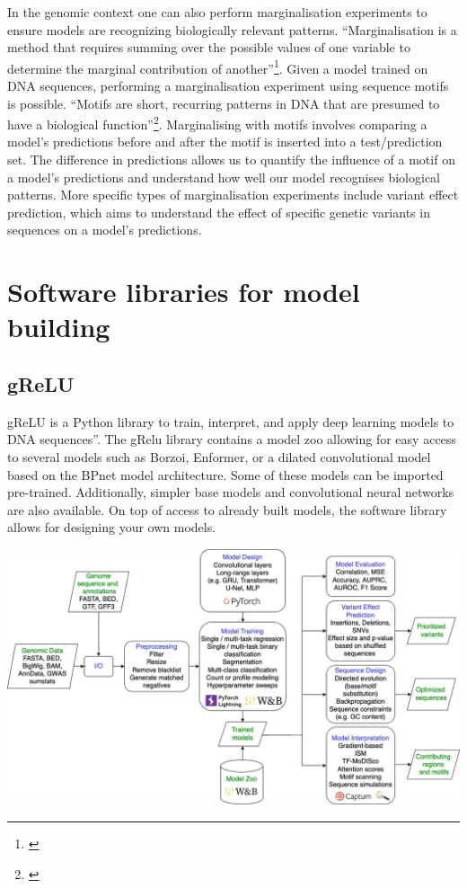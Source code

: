 \documentclass[
]{book}
\begin{document}
In the genomic context one can also perform marginalisation experiments to ensure models are recognizing biologically relevant patterns. ``Marginalisation is a method that requires summing over the possible values of one variable to determine the marginal contribution of another''\footnote{\citet{jonny2018}}. Given a model trained on DNA sequences, performing a marginalisation experiment using sequence motifs is possible. ``Motifs are short, recurring patterns in DNA that are presumed to have a biological function''\footnote{\citet{pat2006}}. Marginalising with motifs involves comparing a model's predictions before and after the motif is inserted into a test/prediction set. The difference in predictions allows us to quantify the influence of a motif on a model's predictions and understand how well our model recognises biological patterns. More specific types of marginalisation experiments include variant effect prediction, which aims to understand the effect of specific genetic variants in sequences on a model's predictions.

\chapter{Software libraries for model building}\label{software-libraries-for-model-building}

\section{gReLU}\label{grelu}

gReLU is a Python library to train, interpret, and apply deep learning models to DNA sequences''. The gRelu library contains a model zoo allowing for easy access to several models such as Borzoi, Enformer, or a dilated convolutional model based on the BPnet model architecture. Some of these models can be imported pre-trained. Additionally, simpler base models and convolutional neural networks are also available. On top of access to already built models, the software library allows for designing your own models.

\includegraphics{images/grelu.png}
\end{document}
